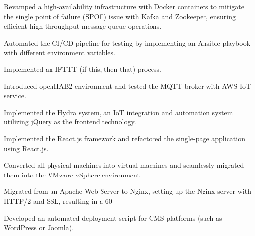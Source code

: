 \documentclass[]{deedy-resume-openfont}
\begin{document}
\begin{minipage}[t]{1\textwidth}
\null\hfill{}
\begin{tightemize}
    \item Revamped a high-availability infrastructure with Docker containers to mitigate the single point of failure (SPOF) issue with Kafka and Zookeeper, ensuring efficient high-throughput message queue operations.
    \item Automated the CI/CD pipeline for testing by implementing an Ansible playbook with different environment variables.
\end{tightemize}
\sectionsep

\null\hfill{}
\begin{tightemize}
    \item Implemented an IFTTT (if this, then that) process.
    \item Introduced openHAB2 environment and tested the MQTT broker with AWS IoT service.
\end{tightemize}
\sectionsep

\null\hfill{}
\begin{tightemize}
    \item Implemented the Hydra system, an IoT integration and automation system utilizing jQuery as the frontend technology.
    \item Implemented the React.js framework and refactored the single-page application using React.js.
\end{tightemize}
\sectionsep

\null\hfill{}
\begin{tightemize}
    \item Converted all physical machines into virtual machines and seamlessly migrated them into the VMware vSphere environment.
    \item Migrated from an Apache Web Server to Nginx, setting up the Nginx server with HTTP/2 and SSL, resulting in a 60%
    \item Developed an automated deployment script for CMS platforms (such as WordPress or Joomla).
\end{tightemize}



\end{minipage}
%
%
\end{document}
